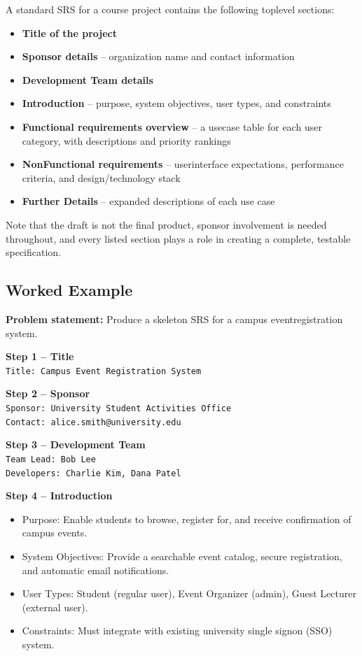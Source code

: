 \documentclass[12pt, a4paper]{article}
\begin{document}
A standard SRS for a course project contains the following toplevel sections:

\begin{itemize}
    \item \textbf{Title of the project}
    \item \textbf{Sponsor details} -- organization name and contact information
    \item \textbf{Development Team details}
    \item \textbf{Introduction} -- purpose, system objectives, user types, and constraints
    \item \textbf{Functional requirements overview} -- a usecase table for each user category, with descriptions and priority rankings
    \item \textbf{NonFunctional requirements} -- userinterface expectations, performance criteria, and design/technology stack
    \item \textbf{Further Details} -- expanded descriptions of each use case
\end{itemize}

Note that the draft is not the final product, sponsor involvement is needed throughout, and every listed section plays a role in creating a complete, testable specification.  

\subsection{Worked Example}
\textbf{Problem statement:} Produce a skeleton SRS for a campus eventregistration system.

\textbf{Step 1 -- Title}\\
\verb|Title: Campus Event Registration System|

\textbf{Step 2 -- Sponsor}\\
\verb|Sponsor: University Student Activities Office|\\
\verb|Contact: alice.smith@university.edu|

\textbf{Step 3 -- Development Team}\\
\verb|Team Lead: Bob Lee|\\
\verb|Developers: Charlie Kim, Dana Patel|

\textbf{Step 4 -- Introduction}\\
\begin{itemize}
    \item Purpose: Enable students to browse, register for, and receive confirmation of campus events.
    \item System Objectives: Provide a searchable event catalog, secure registration, and automatic email notifications.
    \item User Types: Student (regular user), Event Organizer (admin), Guest Lecturer (external user).
    \item Constraints: Must integrate with existing university single signon (SSO) system.
\end{itemize}
\end{document}
